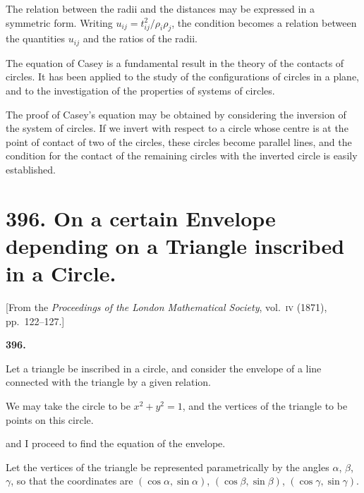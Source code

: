 \documentclass[11pt,a4paper]{article}
\theoremstyle{plain}
\begin{document}
\newpage
\setcounter{equation}{2}

The relation between the radii and the distances may be expressed in a symmetric form. Writing $u_{ij} = t_{ij}^2/\rho_i\rho_j$, the condition becomes a relation between the quantities $u_{ij}$ and the ratios of the radii.

\newpage
\setcounter{equation}{2}

The equation of Casey is a fundamental result in the theory of the contacts of circles. It has been applied to the study of the configurations of circles in a plane, and to the investigation of the properties of systems of circles.

\newpage
\setcounter{equation}{2}

The proof of Casey's equation may be obtained by considering the inversion of the system of circles. If we invert with respect to a circle whose centre is at the point of contact of two of the circles, these circles become parallel lines, and the condition for the contact of the remaining circles with the inverted circle is easily established.

\newpage

\section*{396. On a certain Envelope depending on a Triangle inscribed in a Circle.}
\label{sec:396}
\begin{center}
[From the \textit{Proceedings of the London Mathematical Society}, vol.~\textsc{iv} (1871), pp.~122--127.]
\end{center}

\setcounter{equation}{0}

\textbf{396.}

Let a triangle be inscribed in a circle, and consider the envelope of a line connected with the triangle by a given relation.

We may take the circle to be $x^2 + y^2 = 1$, and the vertices of the triangle to be points on this circle.

\newpage
\setcounter{equation}{0}

and I proceed to find the equation of the envelope.

Let the vertices of the triangle be represented parametrically by the angles $\alpha$, $\beta$, $\gamma$, so that the coordinates are $(\cos\alpha, \sin\alpha)$, $(\cos\beta, \sin\beta)$, $(\cos\gamma, \sin\gamma)$.
\end{document}
